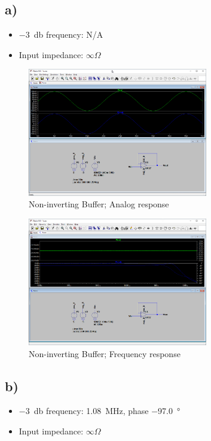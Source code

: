 \documentclass{article}
\begin{document}
	\subsection*{a)}
	
	\begin{itemize}
		\item \SI{-3}{\decibel} frequency: N/A
		\item Input impedance: $\infty \Omega$
	\end{itemize}

	\begin{figure}[H]
	    \centering
	    \includegraphics[width=0.7\textwidth]{1a-1}
	    \caption{Non-inverting Buffer; Analog response}
	\end{figure}

	\begin{figure}[H]
	    \centering
	    \includegraphics[width=0.7\textwidth]{1a-2}
	    \caption{Non-inverting Buffer; Frequency response}
	\end{figure}
	
	\subsection*{b)}

	\begin{itemize}
		\item \SI{-3}{\decibel} frequency: \SI{1.08}{\mega\hertz}, phase \SI{-97.0}{\degree}
		\item Input impedance: $\infty \Omega$
	\end{itemize}
	
\end{document}
